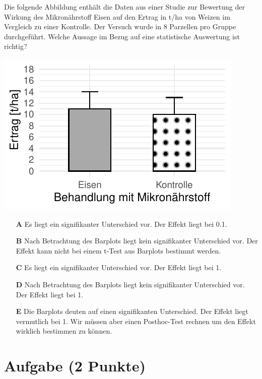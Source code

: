 \documentclass[a4paper, 9pt]{scrartcl}\usepackage[]{graphicx}\usepackage[]{xcolor}
\makeatletter
\def\maxwidth{ %
  \ifdim\Gin@nat@width>\linewidth
    \linewidth
  \else
    \Gin@nat@width
  \fi
}
\makeatother
\begin{document}
Die folgende Abbildung enthält die Daten aus einer Studie zur Bewertung der Wirkung des Mikronährstoff Eisen auf den Ertrag in t/ha von Weizen im Vergleich zu einer Kontrolle. Der Versuch wurde in 8 Parzellen pro Gruppe durchgeführt. Welche Aussage im Bezug auf eine statistische Auswertung ist richtig?



{\centering \includegraphics[width=\maxwidth]{img/mc-testing-ttest-02-1} 

}







\begin{enumerate}
\item [\textbf{A} \msquare] Es liegt ein signifikanter Unterschied vor. Der Effekt liegt bei 0.1.
\item [\textbf{B} \msquare] Nach Betrachtung des Barplots liegt kein signifikanter Unterschied vor. Der Effekt kann nicht bei einem t-Test aus Barplots bestimmt werden.
\item [\textbf{C} \msquare] Es liegt ein signifikanter Unterschied vor. Der Effekt liegt bei 1.
\item [\textbf{D} \msquare] Nach Betrachtung des Barplots liegt kein signifikanter Unterschied vor. Der Effekt liegt bei 1.
\item [\textbf{E} \msquare] Die Barplots deuten auf einen signifikanten Unterschied. Der Effekt liegt vermutlich bei 1. Wir müssen aber einen Posthoc-Test rechnen um den Effekt wirklich bestimmen zu können.
\end{enumerate}

\section{Aufgabe \hfill (2 Punkte)}
\end{document}
